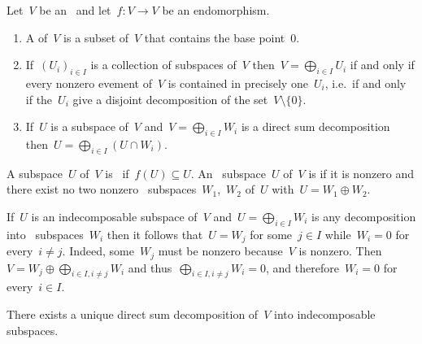 \documentclass[a4paper,11pt]{scrartcl}
\begin{document}
Let~$V$ be an~ and let~$f \colon V \to V$ be an endomorphism.

\begin{recall}
  \begin{enumerate}
    \item
      A  of~$V$ is a subset of~$V$ that contains the base point~$0$.
    \item
      If~$(U_i)_{i \in I}$ is a collection of subspaces of~$V$ then~$V = \bigoplus_{i \in I} U_i$ if and only if every nonzero evement of~$V$ is contained in precisely one~$U_i$, i.e.\ if and only if the~$U_i$ give a disjoint decomposition of the set~$V \setminus \{ 0 \}$.
    \item
      If~$U$ is a subspace of~$V$ and~$V = \bigoplus_{i \in I} W_i$ is a direct sum decomposition then~$U = \bigoplus_{i \in I} (U \cap W_i)$.
  \end{enumerate}
\end{recall}

\begin{definition}
  A subspace~$U$ of~$V$ is~ if~$f(U) \subseteq U$.
  An~ subspace~$U$ of~$V$ is  if it is nonzero and there exist no two nonzero~ subspaces~$W_1$,~$W_2$ of~$U$ with~$U = W_1 \oplus W_2$.
\end{definition}

\begin{remark}
  If~$U$ is an indecomposable subspace of~$V$ and~$U = \bigoplus_{i \in I} W_i$ is any decomposition into~ subspaces~$W_i$ then it follows that~$U = W_j$ for some~$j \in I$ while~$W_i = 0$ for every~$i \neq j$.
  Indeed, some~$W_j$ must be nonzero because~$V$ is nonzero.
  Then~$V = W_j \oplus \bigoplus_{i \in I, i \neq j} W_i$ and thus~$\bigoplus_{i \in I, i \neq j} W_i = 0$, and therefore~$W_i = 0$ for every~$i \in I$.
\end{remark}

\begin{proposition}
  There exists a unique direct sum decomposition of~$V$ into indecomposable~ subspaces.
\end{proposition}
\end{document}
